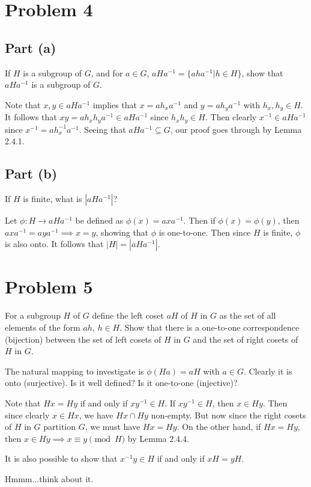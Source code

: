 \documentclass[12pt]{article}
\begin{document}
\section*{Problem 4}

\subsection*{Part (a)}

If $H$ is a subgroup of $G$, and for $a\in G$, $aHa^{-1}=\{aha^{-1}|h\in H\}$, show that $aHa^{-1}$ is a subgroup of $G$.

Note that $x,y\in aHa^{-1}$ implies that $x=ah_xa^{-1}$ and $y=ah_ya^{-1}$ with $h_x,h_y\in H$.
It follows that $xy=ah_xh_ya^{-1}\in aHa^{-1}$ since $h_xh_y\in H$.
Then clearly $x^{-1}\in aHa^{-1}$ since $x^{-1}=ah_x^{-1}a^{-1}$.
Seeing that $aHa^{-1}\subseteq G$, our proof goes through by Lemma 2.4.1.

\subsection*{Part (b)}

If $H$ is finite, what is $|aHa^{-1}|$?

Let $\phi:H\to aHa^{-1}$ be defined as $\phi(x)=axa^{-1}$.  Then if $\phi(x)=\phi(y)$, then $axa^{-1}=aya^{-1}\implies x=y$,
showing that $\phi$ is one-to-one.  Then since $H$ is finite, $\phi$ is also onto.  It follows that $|H|=|aHa^{-1}|$.

\section*{Problem 5}

For a subgroup $H$ of $G$ define the left coset $aH$ of $H$ in $G$ as the set of all elements of the form
$ah$, $h\in H$.  Show that there is a one-to-one correspondence (bijection) between the set of left cosets
of $H$ in $G$ and the set of right cosets of $H$ in $G$.

The natural mapping to investigate is $\phi(Ha)=aH$ with $a\in G$.  Clearly it is onto (surjective).  Is it well defined?  Is it one-to-one (injective)?

Note that $Hx=Hy$ if and only if $xy^{-1}\in H$.  If $xy^{-1}\in H$, then
$x\in Hy$.  Then since clearly $x\in Hx$, we have $Hx\cap Hy$ non-empty.
But now since the right cosets of $H$ in $G$ partition $G$, we must have $Hx=Hy$.
On the other hand, if $Hx=Hy$, then $x\in Hy\implies x\equiv y\pmod{H}$ by Lemma 2.4.4.

It is also possible to show that $x^{-1}y\in H$ if and only if $xH=yH$.

Hmmm...think about it.
\end{document}
